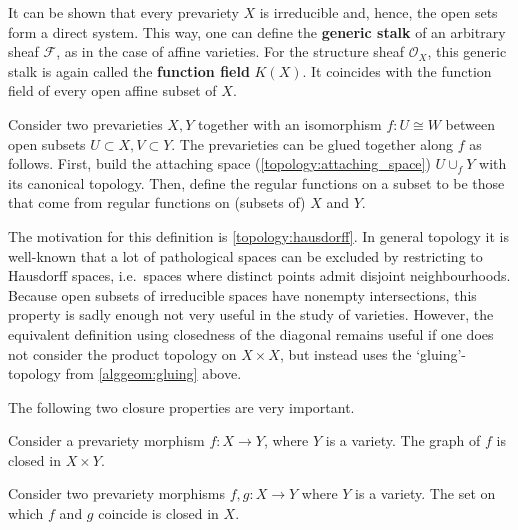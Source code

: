 
    \begin{remark}
        It can be shown that every prevariety $X$ is irreducible and, hence, the open sets form a direct system. This way, one can define the \textbf{generic stalk} of an arbitrary sheaf $\mathcal{F}$, as in the case of affine varieties. For the structure sheaf $\mathcal{O}_X$, this generic stalk is again called the \textbf{function field} $K(X)$. It coincides with the function field of every open affine subset of $X$.
    \end{remark}

    \begin{construct}[Gluing]\label{alggeom:gluing}
        Consider two prevarieties $X,Y$ together with an isomorphism $f:U\cong W$ between open subsets $U\subset X,V\subset Y$. The prevarieties can be glued together along $f$ as follows. First, build the attaching space (\cref{topology:attaching_space}) $U\cup_fY$ with its canonical topology. Then, define the regular functions on a subset to be those that come from regular functions on (subsets of) $X$ and $Y$.
    \end{construct}

    \begin{remark}
        The motivation for this definition is \cref{topology:hausdorff}. In general topology it is well-known that a lot of pathological spaces can be excluded by restricting to Hausdorff spaces, i.e.~spaces where distinct points admit disjoint neighbourhoods. Because open subsets of irreducible spaces have nonempty intersections, this property is sadly enough not very useful in the study of varieties. However, the equivalent definition using closedness of the diagonal remains useful if one does not consider the product topology on $X\times X$, but instead uses the `gluing'-topology from \cref{alggeom:gluing} above.
    \end{remark}

    The following two closure properties are very important.
    \begin{property}\label{alggeom:closed_graph}
        Consider a prevariety morphism $f:X\rightarrow Y$, where $Y$ is a variety. The graph of $f$ is closed in $X\times Y$.
    \end{property}
    \begin{property}
        Consider two prevariety morphisms $f,g:X\rightarrow Y$ where $Y$ is a variety. The set on which $f$ and $g$ coincide is closed in $X$.
    \end{property}

